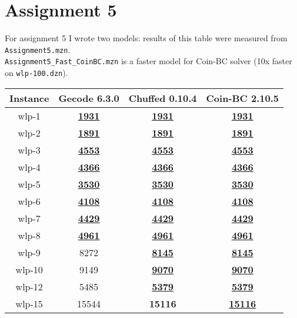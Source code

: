 \documentclass{article}
\newcommand{\sol}[1]{#1}
\newcommand{\opt}[1]{\textbf{#1}}
\newcommand{\proved}[1]{\textbf{\underline{#1}}}
\begin{document}
\section{Assignment 5}

For assignment 5 I wrote two models: results of this table were measured from \texttt{Assignment5.mzn}. \\
\texttt{Assignment5\_Fast\_CoinBC.mzn} is a faster model for Coin-BC solver (10x faster on \texttt{wlp-100.dzn}).

\begin{table}[H]
    \begin{center}
        \begin{tabular}{|c|c|c|c|}
            \hline
            \textbf{Instance}&\textbf{Gecode 6.3.0}&\textbf{Chuffed 0.10.4}&\textbf{Coin-BC 2.10.5}  \\
            \hline
            wlp-1         &     \proved{1931}   &   \proved{1931}   &   \proved{1931}   \\
            \hline
            wlp-2         &     \proved{1891}   &   \proved{1891}   &   \proved{1891}   \\
            \hline
            wlp-3         &     \proved{4553}   &   \proved{4553}   &   \proved{4553}   \\
            \hline
            wlp-4         &     \proved{4366}   &   \proved{4366}   &   \proved{4366}   \\
            \hline
            wlp-5         &     \proved{3530}   &   \proved{3530}   &   \proved{3530}   \\
            \hline
            wlp-6         &     \proved{4108}   &   \proved{4108}   &   \proved{4108}   \\
            \hline
            wlp-7         &     \proved{4429}   &   \proved{4429}   &   \proved{4429}   \\
            \hline
            wlp-8         &     \proved{4961}   &   \proved{4961}   &   \proved{4961}   \\
            \hline
            wlp-9         &     \sol{8272}      &   \proved{8145}   &   \proved{8145}   \\
            \hline
            wlp-10        &     \sol{9149}     &   \proved{9070}   &   \proved{9070}   \\
            \hline
            wlp-12        &     \sol{5485}      &   \proved{5379}   &   \proved{5379}   \\
            \hline
            wlp-15        &     \sol{15544}     &   \opt{15116}     &   \proved{15116}  \\

\end{tabular}
\end{center}
\end{table}
\end{document}
